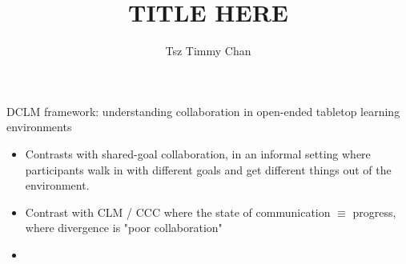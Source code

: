 \documentclass{TC}
\title{TITLE HERE}	%
\author{Tsz Timmy Chan}	%
\begin{document}
\Gls{DCLM} framework: understanding collaboration in open-ended tabletop learning environments 

\begin{itemize}
\item Contrasts with shared-goal collaboration, in an informal setting where participants walk in with different goals and get different things out of the environment.
\item Contrast with CLM / CCC where the state of communication $\equiv$ progress, where divergence is "poor collaboration"
\item 
\end{itemize}
\end{document}
